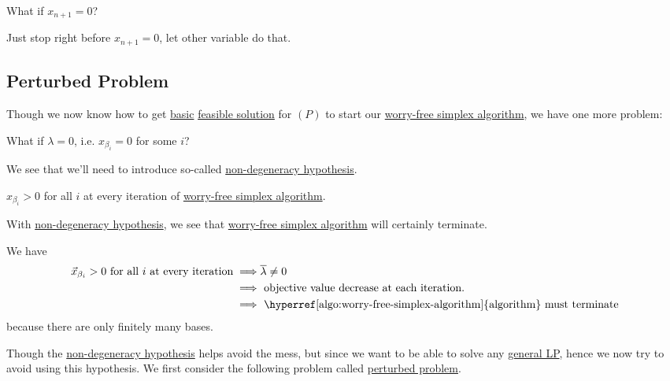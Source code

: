 \begin{problem}
What if \(x_{n+1} = 0\)?
\end{problem}
\begin{answer}
	Just stop right before \(x_{n+1} = 0\), let other variable do that.
\end{answer}

\subsection{Perturbed Problem}
Though we now know how to get \hyperref[def:basic-solution]{basic} \hyperref[def:feasible-solution]{feasible solution} for \((P)\) to start our
\hyperref[algo:worry-free-simplex-algorithm]{worry-free simplex algorithm}, we have one more problem:

\begin{problem}\label{prob:degenerate-problem}
What if \(\lambda = 0\), i.e. \(x_{\beta _{i} } = 0\) for some \(i\)?
\end{problem}

We see that we'll need to introduce so-called \hyperref[def:non-degeneracy-hypothesis]{non-degeneracy hypothesis}.
\begin{definition}\label{def:non-degeneracy-hypothesis}
	\(x_{\beta _{i} } > 0\) for all \(i\) at every iteration of \hyperref[algo:worry-free-simplex-algorithm]{worry-free simplex algorithm}.
\end{definition}

\begin{remark}
	With \hyperref[def:non-degeneracy-hypothesis]{non-degeneracy hypothesis}, we see that \hyperref[algo:worry-free-simplex-algorithm]{worry-free simplex algorithm}
	will certainly terminate.
\end{remark}
\begin{explanation}
	We have
	\[
		\begin{split}
			\vec{x}_{\beta_i} > 0 \text{ for all \(i\) at every iteration}
			\implies &\overline{\lambda} \neq 0\\
			\implies &\text{ objective value decrease at each iteration.}\\
			\implies &\text{ \hyperref[algo:worry-free-simplex-algorithm]{algorithm} must terminate}
		\end{split}
	\]
	because there are only finitely many bases.
\end{explanation}

Though the \hyperref[def:non-degeneracy-hypothesis]{non-degeneracy hypothesis} helps avoid the mess, but since we want to be able to solve any
\hyperref[def:general-linear-programming-problem]{general LP}, hence we now try to avoid using this hypothesis. We first consider the following problem
called \hyperref[def:perturbed-problem]{perturbed problem}.

